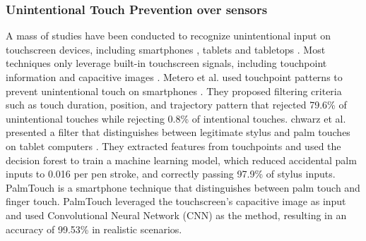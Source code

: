 \subsubsection{Unintentional Touch Prevention over sensors}

A mass of studies have been conducted to recognize unintentional input on touchscreen devices, including smartphones \cite{2012-IdentifyUnint,2015-GestureOn,2018-PalmTouch,2019-BeyondUnint}, tablets \cite{2006-PadUnint,2014-PenUnint,2014-PalmRejection,2013-TapBoard,2016-TapBoard2} and tabletops \cite{2020-TabletopTouch}. Most techniques only leverage built-in touchscreen signals, including touchpoint information \cite{2012-IdentifyUnint,2006-PadUnint,2014-PalmRejection,2013-TapBoard,2016-TapBoard2} and capacitive images \cite{2018-PalmTouch,2014-PenUnint}.
Metero et al. used touchpoint patterns to prevent unintentional touch on smartphones \cite{2012-IdentifyUnint}. They proposed filtering criteria such as touch duration, position, and trajectory pattern that rejected 79.6\% of unintentional touches while rejecting 0.8\% of intentional touches.
chwarz et al. presented a filter that distinguishes between legitimate stylus and palm touches on tablet computers \cite{2014-PalmRejection}. They extracted features from touchpoints and used the decision forest to train a machine learning model, which reduced accidental palm inputs to 0.016 per pen stroke, and correctly passing 97.9\% of stylus inputs.
PalmTouch \cite{2018-PalmTouch} is a smartphone technique that distinguishes between palm touch and finger touch. PalmTouch leveraged the touchscreen's capacitive image as input and used Convolutional Neural Network (CNN) as the method, resulting in an accuracy of 99.53\% in realistic scenarios.



